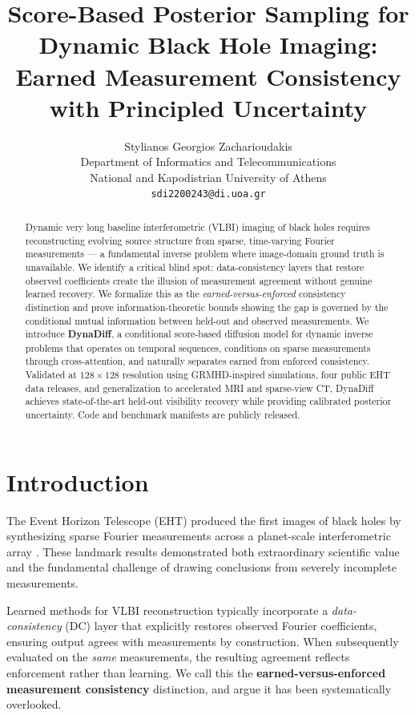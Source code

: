 \documentclass[11pt]{article}
\title{\textbf{Score-Based Posterior Sampling for Dynamic Black Hole Imaging:\\Earned Measurement Consistency with Principled Uncertainty}}
\author{
Stylianos Georgios Zacharioudakis\\
Department of Informatics and Telecommunications\\
National and Kapodistrian University of Athens\\
\texttt{sdi2200243@di.uoa.gr}
}
\date{}
\begin{document}
\maketitle

\begin{abstract}
Dynamic very long baseline interferometric (VLBI) imaging of black holes requires reconstructing evolving source structure from sparse, time-varying Fourier measurements --- a fundamental inverse problem where image-domain ground truth is unavailable. We identify a critical blind spot: data-consistency layers that restore observed coefficients create the illusion of measurement agreement without genuine learned recovery. We formalize this as the \emph{earned-versus-enforced} consistency distinction and prove information-theoretic bounds showing the gap is governed by the conditional mutual information between held-out and observed measurements. We introduce \textbf{DynaDiff}, a conditional score-based diffusion model for dynamic inverse problems that operates on temporal sequences, conditions on sparse measurements through cross-attention, and naturally separates earned from enforced consistency. Validated at $128\times128$ resolution using GRMHD-inspired simulations, four public EHT data releases, and generalization to accelerated MRI and sparse-view CT, DynaDiff achieves state-of-the-art held-out visibility recovery while providing calibrated posterior uncertainty. Code and benchmark manifests are publicly released.
\end{abstract}

\section{Introduction}

The Event Horizon Telescope (EHT) produced the first images of black holes by synthesizing sparse Fourier measurements across a planet-scale interferometric array \citep{EHT2019M87I, EHT2022SgrAI}. These landmark results demonstrated both extraordinary scientific value and the fundamental challenge of drawing conclusions from severely incomplete measurements.

Learned methods for VLBI reconstruction typically incorporate a \emph{data-consistency} (DC) layer that explicitly restores observed Fourier coefficients, ensuring output agrees with measurements by construction. When subsequently evaluated on the \emph{same} measurements, the resulting agreement reflects enforcement rather than learning. We call this the \textbf{earned-versus-enforced measurement consistency} distinction, and argue it has been systematically overlooked.
\end{document}
